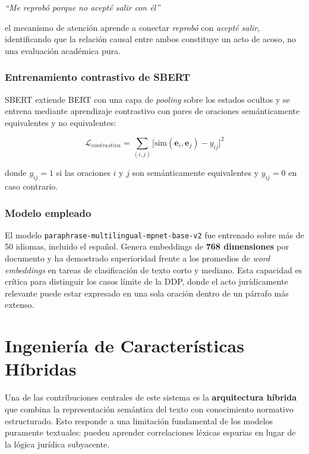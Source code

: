 \begin{center}
  \textit{``Me reprobó porque no acepté salir con él''}
\end{center}

\noindent el mecanismo de atención aprende a conectar \textit{reprobó} con
\textit{acepté salir}, identificando que la relación causal entre ambos
constituye un acto de acoso, no una evaluación académica pura.

\subsubsection*{Entrenamiento contrastivo de SBERT}

SBERT extiende BERT con una capa de \textit{pooling} sobre los estados ocultos
y se entrena mediante aprendizaje contrastivo con pares de oraciones semánticamente equivalentes y no equivalentes:

\begin{equation}
  \mathcal{L}_{contrastiva}
  = \sum_{(i,j)} \bigl[\text{sim}(\mathbf{e}_i, \mathbf{e}_j) - y_{ij}\bigr]^2
  \label{eq:contrastiva}
\end{equation}

donde $y_{ij} = 1$ si las oraciones $i$ y $j$ son semánticamente equivalentes
y $y_{ij} = 0$ en caso contrario.

\subsubsection*{Modelo empleado}

El modelo \texttt{paraphrase-multilingual-mpnet-base-v2} fue entrenado sobre
más de 50 idiomas, incluido el español. Genera embeddings de \textbf{768
dimensiones} por documento y ha demostrado superioridad frente a los promedios
de \textit{word embeddings} en tareas de clasificación de texto corto y mediano.
Esta capacidad es crítica para distinguir los casos límite de la DDP, donde
el acto jurídicamente relevante puede estar expresado en una sola oración dentro
de un párrafo más extenso.

\section{Ingeniería de Características Híbridas}

Una de las contribuciones centrales de este sistema es la \textbf{arquitectura
híbrida} que combina la representación semántica del texto con conocimiento
normativo estructurado. Esto responde a una limitación fundamental de los
modelos puramente textuales: pueden aprender correlaciones léxicas espurias
en lugar de la lógica jurídica subyacente.

